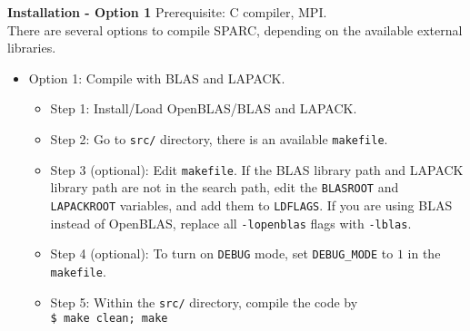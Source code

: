   \begin{frame}{\textbf{Installation - Option 1}} \label{Installation:1}
  Prerequisite: C compiler, MPI.\\
  There are several options to compile SPARC, depending on the available external libraries.
  \begin{itemize}
  \item Option 1: Compile with BLAS and LAPACK.
    \begin{itemize}
      \item Step 1: Install/Load OpenBLAS/BLAS and LAPACK.
      \item Step 2: Go to \texttt{src/} directory, there is an available \texttt{makefile}.
      \item Step 3 (optional): Edit \texttt{makefile}. If the BLAS library path and LAPACK library path are not in the search path, edit the \texttt{BLASROOT} and \texttt{LAPACKROOT} variables, and add them to \texttt{LDFLAGS}. If you are using BLAS instead of OpenBLAS, replace all \texttt{-lopenblas} flags with \texttt{-lblas}.
      \item Step 4 (optional): To turn on \texttt{DEBUG} mode, set \texttt{DEBUG\_MODE} to $1$ in the \texttt{makefile}.
      \item Step 5: Within the \texttt{src/} directory, compile the code by \\
            \texttt{\$ make clean; make}
    \end{itemize}
  \end{itemize}
  \end{frame}
  
